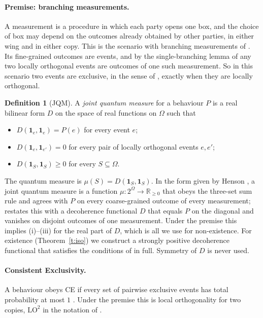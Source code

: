\documentclass[11pt,a4paper]{article}
\theoremstyle{definition}
\newtheorem{definition}[theorem]{Definition}
\theoremstyle{remark}
\newcommand{\ind}[1]{\mathbf{1}_{#1}}
\begin{document}
\paragraph{Premise: branching measurements.} A measurement is a procedure in which each party opens one
box, and the choice of box may depend on the outcomes already obtained by other parties, in either wing
and in either copy. This is the scenario with branching measurements of \cite[Section on branching
measurements]{DHW}. Its fine-grained outcomes are events, and by the single-branching lemma of
\cite{DHW} any two locally orthogonal events are outcomes of one such measurement. So in this scenario
two events are exclusive, in the sense of \cite{Henson}, exactly when they are locally orthogonal.

\begin{definition}[JQM]\label{d:jqm}
A \emph{joint quantum measure} for a behaviour $P$ is a real bilinear form $D$ on the space of real
functions on $\Omega$ such that
\begin{itemize}
\item[(i)] $D(\ind e,\ind e)=P(e)$ for every event $e$;
\item[(ii)] $D(\ind e,\ind{e'})=0$ for every pair of locally orthogonal events $e,e'$;
\item[(iii)] $D(\ind S,\ind S)\ge 0$ for every $S\subseteq\Omega$.
\end{itemize}
\end{definition}

The quantum measure is $\mu(S)=D(\ind S,\ind S)$. In the form given by Henson \cite{Henson}, a joint
quantum measure is a function $\mu:2^\Omega\to\mathbb{R}_{\ge0}$ that obeys the three-set sum rule and
agrees with $P$ on every coarse-grained outcome of every measurement; \cite[the lemma following the
definition of JQM]{DHW} restates this with a decoherence functional $D$ that equals $P$ on the diagonal
and vanishes on disjoint outcomes of one measurement. Under the premise this implies (i)--(iii) for the
real part of $D$, which is all we use for non-existence. For existence (Theorem~\ref{t:iso}) we construct
a strongly positive decoherence functional that satisfies the conditions of \cite{DHW} in full. Symmetry
of $D$ is never used.

\paragraph{Consistent Exclusivity.} A behaviour obeys CE if every set of pairwise exclusive events has
total probability at most $1$ \cite{Henson}. Under the premise this is local orthogonality for two
copies, $\mathrm{LO}^2$ in the notation of \cite{Sainz}.
\end{document}
